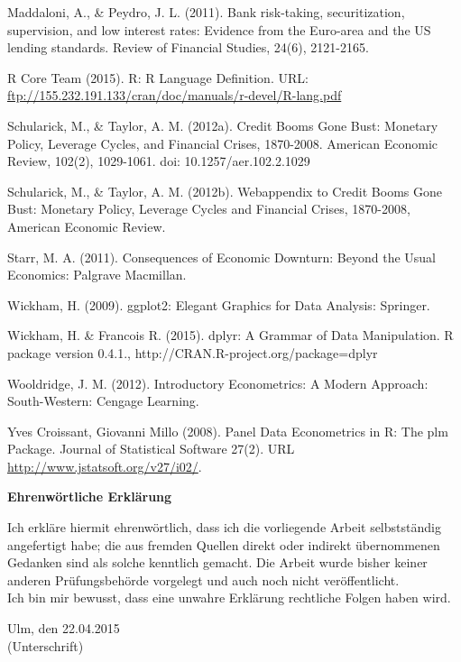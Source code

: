 \documentclass[a4paper,11pt,abstract=on]{scrartcl}
\begin{document}
Maddaloni, A., \& Peydro, J. L. (2011). Bank risk-taking, securitization, supervision, and low interest rates: Evidence from the Euro-area and the US lending standards. Review of Financial Studies, 24(6), 2121-2165.

R Core Team (2015). R: R Language Definition. URL:
\url{ftp://155.232.191.133/cran/doc/manuals/r-devel/R-lang.pdf}

Schularick, M., \& Taylor, A. M. (2012a). Credit Booms Gone Bust:
Monetary Policy, Leverage Cycles, and Financial Crises, 1870-2008.
American Economic Review, 102(2), 1029-1061. doi: 10.1257/aer.102.2.1029

Schularick, M., \& Taylor, A. M. (2012b). Webappendix to Credit Booms
Gone Bust: Monetary Policy, Leverage Cycles and Financial Crises,
1870-2008, American Economic Review.

Starr, M. A. (2011). Consequences of Economic Downturn: Beyond the Usual Economics: Palgrave Macmillan.

Wickham, H. (2009). ggplot2: Elegant Graphics for Data Analysis:
Springer.

Wickham, H. \& Francois R. (2015). dplyr: A Grammar of Data Manipulation. R package version 0.4.1., http://CRAN.R-project.org/package=dplyr

Wooldridge, J. M. (2012). Introductory Econometrics: A Modern Approach:
South-Western: Cengage Learning.

Yves Croissant, Giovanni Millo (2008). Panel Data Econometrics in R: The
plm Package. Journal of Statistical Software 27(2). URL
\url{http://www.jstatsoft.org/v27/i02/}.

\eject


\thispagestyle{empty}
\begin{center}
{\large\bf Ehrenwörtliche Erklärung}
\end{center}

\vspace*{1cm}

\noindent
Ich erkläre hiermit ehrenwörtlich, dass ich die vorliegende Arbeit
selbstständig angefertigt habe; die aus fremden Quellen direkt oder indirekt 
übernommenen Gedanken sind als solche kenntlich gemacht. Die Arbeit wurde 
bisher keiner anderen Prüfungsbehörde vorgelegt und auch noch nicht 
veröffentlicht.\\

\noindent
Ich bin mir bewusst, dass eine unwahre Erklärung rechtliche Folgen haben wird.

\vspace{2cm}



\noindent Ulm, den 22.04.2015 \hspace{4cm}\hrulefill\\
\vspace*{0.5cm}
\hspace*{11.0cm} (Unterschrift)

\end{document}
